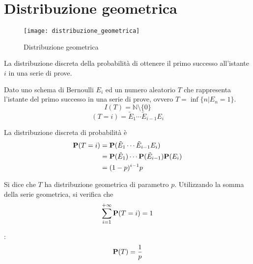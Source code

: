 
\section{Distribuzione geometrica} %
\begin{figure*}
  \texttt{[image: distribuzione\_geometrica]}
  \caption{Distribuzione geometrica} 
\end{figure*}

\begin{definition}\label{def:distribuzione_geometrica}
  La distribuzione discreta della probabilità di ottenere il primo successo all'istante $i$ in una serie di prove.
\end{definition}

Dato uno schema di Bernoulli \( E_i \) ed un numero aleatorio \( T \) che rappresenta l'istante del primo successo in una serie di prove, ovvero \( T = \inf\{ n | E_n = 1 \} \).
\[
  I(T) = \mathbb{N} \setminus \{ 0 \}
\]
\[
  (T = i) = \tilde{E}_1 \cdots \tilde{E}_{i-1} E_i
\]

La distribuzione discreta di probabilità è
\begin{align*}
  \mathbf{P}(T = i) &= \mathbf{P}(\tilde{E}_1 \cdots \tilde{E}_{i-1} E_i) \\
  &= \mathbf{P}(\tilde{E}_1) \cdots \mathbf{P}(\tilde{E}_{i-1}) \mathbf{P}(E_i) \\
  &= (1-p)^{i-1} p  
\end{align*}

Si dice che \( T \) ha distribuzione geometrica di parametro \( p \). Utilizzando 
la somma della serie geometrica, si verifica che
\[
  \sum_{i=1}^{+ \infty} \mathbf{P}(T = i) = 1
\]

:
\[
  \mathbf{P}(T) = \frac{1}{p}
\]

